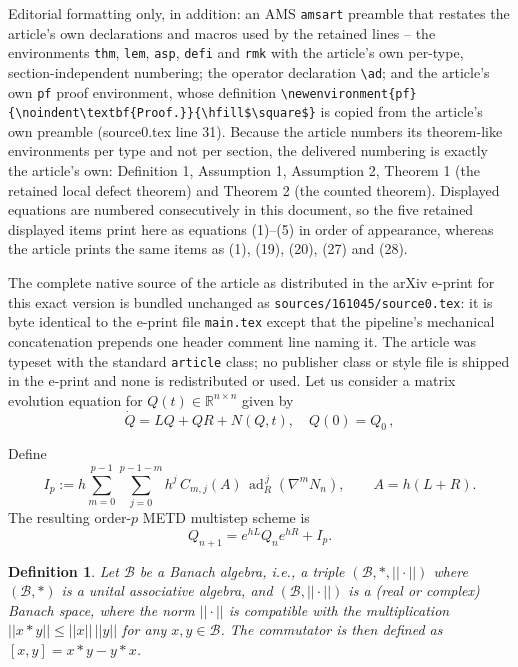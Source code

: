 \documentclass[10pt,a4paper]{amsart}
\newtheorem{defi}{Definition}
\DeclareMathOperator{\ad}{ad}
\begin{document}
Editorial formatting only, in addition: an AMS \texttt{amsart} preamble that restates the article's own declarations and macros used by the retained lines -- the environments \texttt{thm}, \texttt{lem}, \texttt{asp}, \texttt{defi} and \texttt{rmk} with the article's own per-type, section-independent numbering; the operator declaration \texttt{\textbackslash ad}; and the article's own \texttt{pf} proof environment, whose definition \texttt{\textbackslash newenvironment\{pf\}\{\textbackslash noindent\textbackslash textbf\{Proof.\}\}\{\textbackslash hfill\$\textbackslash square\$\}} is copied from the article's own preamble (source0.tex line 31). Because the article numbers its theorem-like environments per type and not per section, the delivered numbering is exactly the article's own: Definition 1, Assumption 1, Assumption 2, Theorem 1 (the retained local defect theorem) and Theorem 2 (the counted theorem). Displayed equations are numbered consecutively in this document, so the five retained displayed items print here as equations (1)--(5) in order of appearance, whereas the article prints the same items as (1), (19), (20), (27) and (28).

The complete native source of the article as distributed in the arXiv e-print for this exact version is bundled unchanged as \texttt{sources/161045/source0.tex}: it is byte identical to the e-print file \texttt{main.tex} except that the pipeline's mechanical concatenation prepends one header comment line naming it. The article was typeset with the standard \texttt{article} class; no publisher class or style file is shipped in the e-print and none is redistributed or used.
Let us consider a matrix evolution equation for $Q(t) \in \mathbb{R}^{n \times n}$ given by 
\begin{equation}
    \label{eq:ODE}
    \dot Q = LQ + QR + N(Q,t),\quad Q(0) = Q_0\,,
\end{equation}

Define
\begin{equation}
\label{eq:metdp_Ip}
    I_p := h\sum_{m=0}^{p-1}\sum_{j=0}^{p-1-m} h^j\,C_{m,j}(A)\,
    \ad_R^{\,j}\!\left(\nabla^m N_n\right),
    \qquad A=h(L+R).
\end{equation}
The resulting order-$p$ METD multistep scheme is
\begin{equation}
\label{eq:metdp_scheme}
    Q_{n+1}=e^{hL}Q_ne^{hR}+I_p.
\end{equation}

\begin{defi}\label{def:1}
    Let $\mathcal{B}$ be a Banach algebra, i.e., a triple $(\mathcal{B}, \ast, ||\cdot||)$ where $(\mathcal{B}, \ast)$ is a unital associative algebra, and $(\mathcal{B},||\cdot||)$ is a (real or complex) Banach space, where the norm $||\cdot||$ is compatible with the multiplication $||x \ast y|| \leq ||x||\,||y||$ for any $x,y \in \mathcal{B}$. The commutator is then defined as $[x,y] = x \ast y - y \ast x$.
\end{defi}
\end{document}
